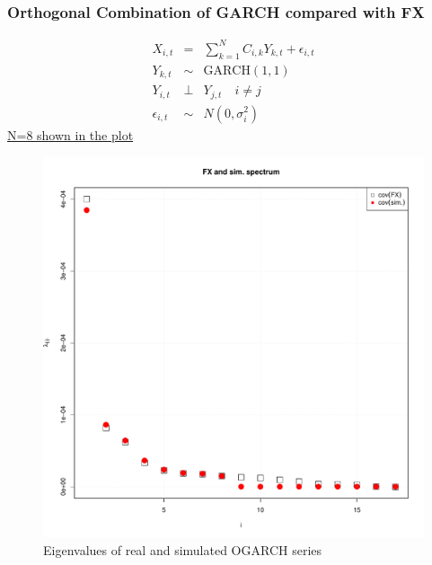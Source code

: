 \documentclass{beamer}
\begin{document}
\begin{frame}
  \frametitle{Orthogonal Combination of GARCH compared with FX}
  \begin{minipage}{0.6\linewidth}
    \begin{scriptsize}
      \begin{eqnarray*}
        X_{i, t} &=& \sum_{k=1}^N C_{i,k} Y_{k, t} + \epsilon_{i, t} \\
        Y_{k, t} &\sim& \text{GARCH}(1,1) \\
        Y_{i, t} &\bot& Y_{j, t} \quad i \neq j\\
        \epsilon_{i,t} &\sim& N(0, \sigma_i^2)
      \end{eqnarray*}
      \underline{N=8 shown in the plot}
    \end{scriptsize}
  \end{minipage}\hfill
  \begin{minipage}{0.4\linewidth}
    \begin{figure}[htb!]
      \centering
      \includegraphics[width=1.0\linewidth]{FX_OGARCH_eigenvalues.pdf}
      \caption{\scriptsize Eigenvalues of real and simulated OGARCH series}
    \end{figure}
  \end{minipage}
\end{frame}
\end{document}
